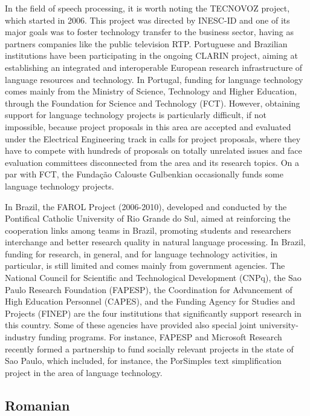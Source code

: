 \documentclass[10pt, plain]{../../metanetpaper}
\begin{document}
\begin{multicols}{2}
In the field of speech processing, it is worth noting the TECNOVOZ project, which started in 2006. This project was directed by INESC-ID and one of its major goals was to foster technology transfer to the business sector, having as partners companies like the public television RTP.  Portuguese and Brazilian institutions have been participating in the ongoing CLARIN project, aiming at establishing an integrated and interoperable European research infrastructure of language resources and technology.  In Portugal, funding for language technology comes mainly from the Ministry of Science, Technology and Higher Education, through the Foundation for Science and Technology (FCT). However, obtaining support for language technology projects is particularly difficult, if not impossible, because project proposals in this area are accepted and evaluated under the Electrical Engineering track in calls for project proposals, where they have to compete with hundreds of proposals on totally unrelated issues and face evaluation committees disconnected from the area and its research topics. On a par with FCT, the Fundação Calouste Gulbenkian occasionally funds some language technology projects.

In Brazil, the FAROL Project (2006-2010), developed and conducted by the Pontifical Catholic University of Rio Grande do Sul, aimed at reinforcing the cooperation links among teams in Brazil, promoting students and researchers interchange and better research quality in natural language processing.  In Brazil, funding for research, in general, and for language technology activities, in particular, is still limited and comes mainly from government agencies. The National Council for Scientific and Technological Development (CNPq), the Sao Paulo Research Foundation (FAPESP), the Coordination for Advancement of High Education Personnel (CAPES), and the Funding Agency for Studies and Projects (FINEP) are the four institutions that significantly support research in this country. Some of these agencies have provided also special joint university-industry funding programs. For instance, FAPESP and Microsoft Research recently formed a partnership to fund socially relevant projects in the state of Sao Paulo, which included, for instance, the PorSimples text simplification project in the area of language technology.

\subsection*{Romanian}
\label{sec:romanian}


\end{multicols}
\end{document}

